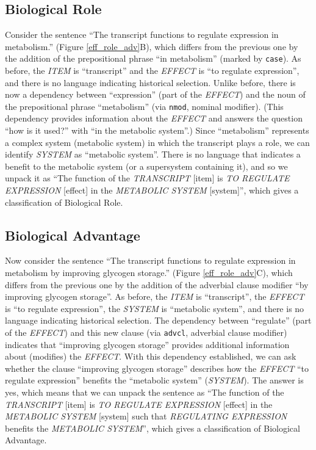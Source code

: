\documentclass{article}
\begin{document}
\subsection{Biological Role}
\label{sec:biological-role-1}

Consider the sentence ``The transcript functions to regulate expression in metabolism.'' (Figure \ref{eff_role_adv}B), which differs from the previous one by the addition of the prepositional phrase ``in metabolism'' (marked by \texttt{case}).
As before, the \emph{ITEM} is ``transcript'' and the \emph{EFFECT} is ``to regulate expression'', and there is no language indicating historical selection.
Unlike before, there is now a dependency between ``expression'' (part of the \emph{EFFECT}) and the noun of the prepositional phrase ``metabolism'' (via \texttt{nmod}, nominal modifier).
(This dependency provides information about the \emph{EFFECT} and answers the question ``how is it used?'' with ``in the metabolic system''.)
Since ``metabolism'' represents a complex system (metabolic system) in which the transcript plays a role, we can identify \emph{SYSTEM} as ``metabolic system''.
There is no language that indicates a benefit to the metabolic system (or a supersystem containing it), and so we unpack it as ``The function of the \emph{TRANSCRIPT} [item] is \emph{TO REGULATE EXPRESSION} [effect] in the \emph{METABOLIC SYSTEM} [system]'', which gives a classification of Biological Role.

\subsection{Biological Advantage}
\label{sec:biological-advantage-1}

Now consider the sentence ``The transcript functions to regulate expression in metabolism by improving glycogen storage.'' (Figure \ref{eff_role_adv}C), which differs from the previous one by the addition of the adverbial clause modifier ``by improving glycogen storage''.
As before, the \emph{ITEM} is ``transcript'', the \emph{EFFECT} is ``to regulate expression'', the \emph{SYSTEM} is ``metabolic system'', and there is no language indicating historical selection.
The dependency between ``regulate'' (part of the \emph{EFFECT}) and this new clause (via \texttt{advcl}, adverbial clause modifier) indicates that ``improving glycogen storage'' provides additional information about (modifies) the \emph{EFFECT}.
With this dependency established, we can ask whether the clause ``improving glycogen storage'' describes how  the \emph{EFFECT} ``to regulate expression'' benefits the ``metabolic system'' (\emph{SYSTEM}).
The answer is yes, which means that we can unpack the sentence as ``The function of the \emph{TRANSCRIPT} [item] is \emph{TO REGULATE EXPRESSION} [effect] in the \emph{METABOLIC SYSTEM} [system] such that \emph{REGULATING EXPRESSION} benefits the \emph{METABOLIC SYSTEM}'', which gives a classification of Biological Advantage.
\end{document}
